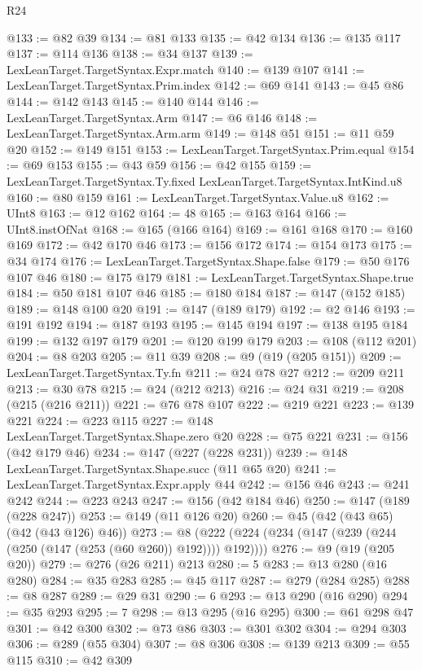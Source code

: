 \begin{lexlean}{R24}
\begin{coremodule}
@133 := @82 @39
@134 := @81 @133
@135 := @42 @134
@136 := @135 @117
@137 := @114 @136
@138 := @34 @137
@139 := LexLeanTarget.TargetSyntax.Expr.match
@140 := @139 @107
@141 := LexLeanTarget.TargetSyntax.Prim.index
@142 := @69 @141
@143 := @45 @86
@144 := @142 @143
@145 := @140 @144
@146 := LexLeanTarget.TargetSyntax.Arm
@147 := @6 @146
@148 := LexLeanTarget.TargetSyntax.Arm.arm
@149 := @148 @51
@151 := @11 @59 @20
@152 := @149 @151
@153 := LexLeanTarget.TargetSyntax.Prim.equal
@154 := @69 @153
@155 := @43 @59
@156 := @42 @155
@159 := LexLeanTarget.TargetSyntax.Ty.fixed LexLeanTarget.TargetSyntax.IntKind.u8
@160 := @80 @159
@161 := LexLeanTarget.TargetSyntax.Value.u8
@162 := UInt8
@163 := @12 @162
@164 := 48
@165 := @163 @164
@166 := UInt8.instOfNat
@168 := @165 (@166 @164)
@169 := @161 @168
@170 := @160 @169
@172 := @42 @170 @46
@173 := @156 @172
@174 := @154 @173
@175 := @34 @174
@176 := LexLeanTarget.TargetSyntax.Shape.false
@179 := @50 @176 @107 @46
@180 := @175 @179
@181 := LexLeanTarget.TargetSyntax.Shape.true
@184 := @50 @181 @107 @46
@185 := @180 @184
@187 := @147 (@152 @185)
@189 := @148 @100 @20
@191 := @147 (@189 @179)
@192 := @2 @146
@193 := @191 @192
@194 := @187 @193
@195 := @145 @194
@197 := @138 @195 @184
@199 := @132 @197 @179
@201 := @120 @199 @179
@203 := @108 (@112 @201)
@204 := @8 @203
@205 := @11 @39
@208 := @9 (@19 (@205 @151))
@209 := LexLeanTarget.TargetSyntax.Ty.fn
@211 := @24 @78 @27
@212 := @209 @211
@213 := @30 @78
@215 := @24 (@212 @213)
@216 := @24 @31
@219 := @208 (@215 (@216 @211))
@221 := @76 @78 @107
@222 := @219 @221
@223 := @139 @221
@224 := @223 @115
@227 := @148 LexLeanTarget.TargetSyntax.Shape.zero @20
@228 := @75 @221
@231 := @156 (@42 @179 @46)
@234 := @147 (@227 (@228 @231))
@239 := @148 LexLeanTarget.TargetSyntax.Shape.succ (@11 @65 @20)
@241 := LexLeanTarget.TargetSyntax.Expr.apply @44
@242 := @156 @46
@243 := @241 @242
@244 := @223 @243
@247 := @156 (@42 @184 @46)
@250 := @147 (@189 (@228 @247))
@253 := @149 (@11 @126 @20)
@260 := @45 (@42 (@43 @65) (@42 (@43 @126) @46))
@273 := @8 (@222 (@224 (@234 (@147 (@239 (@244 (@250 (@147 (@253 (@60 @260)) @192)))) @192))))
@276 := @9 (@19 (@205 @20))
@279 := @276 (@26 @211) @213
@280 := 5
@283 := @13 @280 (@16 @280)
@284 := @35 @283
@285 := @45 @117
@287 := @279 (@284 @285)
@288 := @8 @287
@289 := @29 @31
@290 := 6
@293 := @13 @290 (@16 @290)
@294 := @35 @293
@295 := 7
@298 := @13 @295 (@16 @295)
@300 := @61 @298 @47
@301 := @42 @300
@302 := @73 @86
@303 := @301 @302
@304 := @294 @303
@306 := @289 (@55 @304)
@307 := @8 @306
@308 := @139 @213
@309 := @55 @115
@310 := @42 @309

\end{coremodule}
\end{lexlean}
